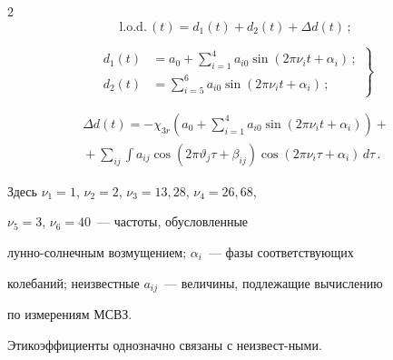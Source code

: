 \begin{multicols}{2}
    $$\mathrm{l.o.d.}\,(t)=d_{1}(t)+d_{2}(t)+\Delta d(t)\,;$$





\noindent


\begin{equation}


\left.


\begin{array}{rl}


d_{1}(t)&=\displaystyle a_{0}+\sum_{i=1}^{4}a_{i0}\sin(2\pi\nu_{i}t+\alpha_{i})\,;\\[9pt] 


d_{2}(t)&=\displaystyle \sum_{i=5}^{6}a_{i0}\sin(2\pi\nu_{i}t+\alpha_{i})\,;


\end{array}


\right\}


\label{e92-mar}


\end{equation}





\vspace*{-6pt}





\noindent


\begin{multline*}


\Delta d(t)=-\chi_{3r}\left(a_{0}+\sum_{i=1}^{4}a_{i0}\sin(2\pi\nu_{i}t+\alpha_{i})\right)+{}\\


{}+\sum_{ij}\int a_{ij}\cos(2\pi\vartheta_{j}\tau+\beta_{ij})\cos(2\pi\nu_{i}\tau+\alpha_{i})\,d\tau\,. 




\end{multline*}


Здесь $\nu_{1}=1$, $\nu_{2}=2$, $\nu_{3}=13{,}28$, $\nu_{4}=26{,}68$,


$\nu_{5}=3$, $\nu_{6}=40$~--- частоты, обусловленные


лун\-но-сол\-неч\-ным возмущением; $\alpha_{i}$~--- фазы соответствующих


колебаний; неизвестные $a_{ij}$~--- величины, подлежащие вычислению


 по измерениям \mbox{МСВЗ}. 




 Эти\linebreak коэффициенты однозначно связаны с неизвест-\linebreak ными.



\end{multicols}
